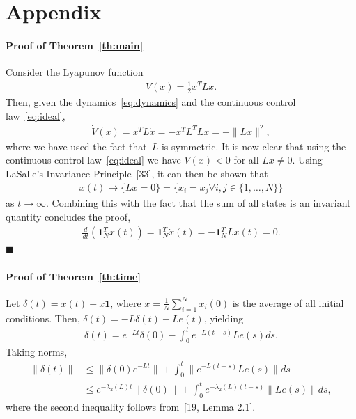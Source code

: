 \documentclass[]{book}
\newcommand{\ones}[1]{\mathbf{1}_{#1}}
\newcommand{\until}[1]{\{1,\dots, #1\}}
\newcommand{\TwoNorm}[1]{\|#1\|_2}
\renewcommand{\TwoNorm}[1]{\|#1\|}
\begin{document}
%
%
%
\backmatter
%

\appendix

\section*{Appendix}

\paragraph{\textbf{Proof of Theorem~\ref{th:main}}}
Consider the Lyapunov function
\begin{align*}
  V(x) = \frac{1}{2} x^T L x .
\end{align*}
Then, given the dynamics~\eqref{eq:dynamics} and the continuous
control law~\eqref{eq:ideal},
\begin{align*}
  \dot{V}(x) = x^T L \dot{x} = -x^T L^T L x = - \TwoNorm{Lx}^2,
\end{align*}
where we have used the fact that~$L$ is symmetric. It is now clear
that using the continuous control law~\eqref{eq:ideal} we have
$\dot{V}(x) < 0$ for all $Lx \neq 0$. Using LaSalle's Invariance
Principle~[33], it can then be shown that
\begin{align*}
  x(t) \rightarrow \{ Lx = 0 \} = \{ x_i = x_j \forall i,j \in \until{N} \}
\end{align*}
as $t \rightarrow \infty$. Combining this with the fact that the sum
of all states is an invariant quantity concludes the proof,
\begin{align*}
  \frac{d}{dt} \left( \ones{N}^T x(t) \right) = \ones{N}^T \dot{x}(t)
  = -\ones{N}^T L x(t) = 0 .
\end{align*}
\hfill $\blacksquare$

\paragraph{\textbf{Proof of Theorem~\ref{th:time}}}
Let $\delta(t) = x(t) - \bar{x} \mathbf{1}$, where $\bar{x} = \frac{1}{N}
\sum_{i=1}^N x_i(0)$ is the average of all initial conditions. Then,
$\dot{\delta}(t) = - L \delta(t) - L e(t)$, yielding
\begin{align*}
  \delta(t) = e^{-Lt} \delta(0) - \int_0^t e^{-L(t-s)} L e(s) ds .
\end{align*}
Taking norms,
\begin{align*}
  \TwoNorm{\delta(t)} &\leq \TwoNorm{ \delta(0) e^{-Lt}} + \int_0^t
  \TwoNorm{ e^{-L(t-s)} Le(s) } ds
  \\
  &\leq e^{- \lambda_2(L) t} \TwoNorm{\delta(0)} + \int_0^t
  e^{-\lambda_2(L)(t-s)} \TwoNorm{L e(s)} ds, 
\end{align*}
where the second inequality follows from~[19, Lemma 2.1].
\end{document}
